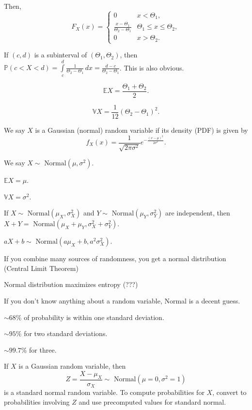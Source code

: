\documentclass{article}
\begin{document}
    Then, $$F_X(x) = \begin{cases} 0 & x < \Theta_1, \\ \frac{x - \Theta_1}{\Theta_2 - \Theta_1} & \Theta_1 \leq x \leq \Theta_2, \\ 0 & x > \Theta_2. \end{cases}$$

    If $(c,d)$ is a subinterval of $(\Theta_1, \Theta_2)$, then $\mathbb P(c < X < d) = \int\limits_c^d \frac1{\Theta_2 - \Theta_1}\,dx = \frac{d - c}{\Theta_2 - \Theta_1}$. This is also obvious.
    
    $$\mathbb EX = \frac{\Theta_1 + \Theta_2}{2}.$$
    
    $$\mathbb VX = \frac1{12}(\Theta_2 - \Theta_1)^2.$$

\medskip
{}

    We say $X$ is a Gaussian (normal) random variable if its density (PDF) is given by $$f_X(x) = \frac1{\sqrt{2\pi\sigma^2}} e^{-\frac{(x-\mu)^2}{2\sigma^2}}.$$
    
    We say $X \sim \text{ Normal}(\mu, \sigma^2)$.
    
    $\mathbb EX = \mu$.
    
    $\mathbb VX = \sigma^2$.
    
    If $X \sim \text{ Normal}(\mu_X,\sigma_X^2)$ and $Y \sim \text{ Normal}(\mu_Y,\sigma_Y^2)$ are independent, then $X+Y = \text{ Normal}(\mu_X + \mu_Y, \sigma^2_X + \sigma^2_Y)$.
    
    $aX+b \sim \text{ Normal}(a\mu_X+b, a^2\sigma_X^2)$.
    
    If you combine many sources of randomness, you get a normal distribution (Central Limit Theorem)
    
    Normal distribution maximizes entropy (???)
    
    If you don't know anything about a random variable, Normal is a decent guess.
    
    $\sim68\%$ of probability is within one standard deviation. 

    $\sim95\%$ for two standard deviations.
    
    $\sim99.7\%$ for three.
    
\medskip
{}

    If $X$ is a Gaussian random variable, then $$Z = \frac{X-\mu_X}{\sigma_X} \sim \text{ Normal}(\mu=0, \sigma^2=1)$$ is a standard normal random variable. To compute probabilities for $X$, convert to probabilities involving $Z$ and use precomputed values for standard normal.
\end{document}
